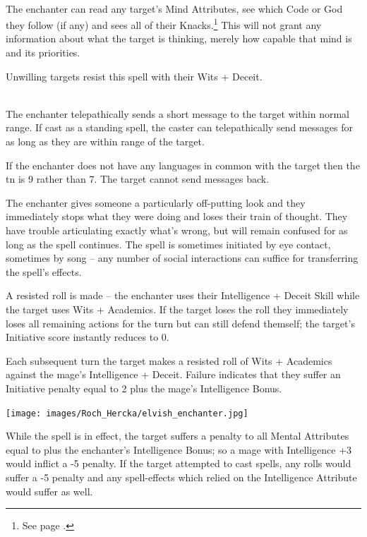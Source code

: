 \begin{multicols}{2}
{\\
The enchanter can read any target's Mind Attributes, see which Code or God they follow (if any) and sees all of their Knacks.\footnote{See page \pageref{gods_codes}.}
This will not grant any information about what the target is thinking, merely how capable that mind is and its priorities.

Unwilling targets resist this spell with their Wits + Deceit.

\\
The enchanter telepathically sends a short message to the target within normal range. If cast as a standing spell, the caster can telepathically send messages for as long as they are within range of the target.

If the enchanter does not have any languages in common with the target then the \gls{tn} is 9 rather than 7. The target cannot send messages back.

\spelllevel


The enchanter gives someone a particularly off-putting look and they immediately stops what they were doing and loses their train of thought.
They have trouble articulating exactly what's wrong, but will remain confused for as long as the spell continues.
The spell is sometimes initiated by eye contact, sometimes by song -- any number of social interactions can suffice for transferring the spell's effects.

A resisted roll is made -- the enchanter uses their Intelligence + Deceit Skill while the target uses Wits + Academics.
If the target loses the roll they immediately loses all remaining actions for the turn but can still defend themself; the target's Initiative score instantly reduces to 0.

Each subsequent turn the target makes a resisted roll of Wits + Academics against the mage's Intelligence + Deceit. Failure indicates that they suffer an Initiative penalty equal to 2 plus the mage's Intelligence Bonus.

	\noindent\texttt{[image: images/Roch\_Hercka/elvish\_enchanter.jpg]}
	\label{roch:enchanter}
}{}

While the spell is in effect, the target suffers a penalty to all Mental Attributes equal to  plus the enchanter's Intelligence Bonus; so a mage with Intelligence +3 would inflict a -5 penalty. If the target attempted to cast spells, any rolls would suffer a -5 penalty and any spell-effects which relied on the Intelligence Attribute would suffer as well.


\end{multicols}
